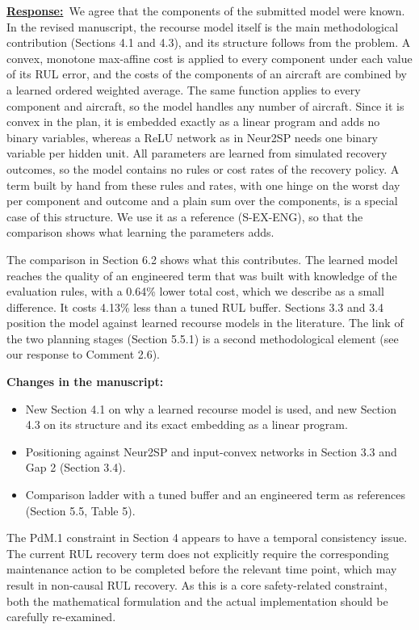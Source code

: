 \documentclass{article}
\newcommand{\response}{\vspace{0.1cm}\noindent\underline{\textbf{Response:}}\ }
\newcommand{\changes}{\vspace{0.1cm}\noindent\textbf{Changes in the manuscript:}}
\begin{document}
\response We agree that the components of the submitted model were known. In the revised manuscript, the recourse model itself is the main methodological contribution (Sections 4.1 and 4.3), and its structure follows from the problem. A convex, monotone max-affine cost is applied to every component under each value of its RUL error, and the costs of the components of an aircraft are combined by a learned ordered weighted average. The same function applies to every component and aircraft, so the model handles any number of aircraft. Since it is convex in the plan, it is embedded exactly as a linear program and adds no binary variables, whereas a ReLU network as in Neur2SP needs one binary variable per hidden unit. All parameters are learned from simulated recovery outcomes, so the model contains no rules or cost rates of the recovery policy. A term built by hand from these rules and rates, with one hinge on the worst day per component and outcome and a plain sum over the components, is a special case of this structure. We use it as a reference (S-EX-ENG), so that the comparison shows what learning the parameters adds.

The comparison in Section 6.2 shows what this contributes. The learned model reaches the quality of an engineered term that was built with knowledge of the evaluation rules, with a 0.64\% lower total cost, which we describe as a small difference. It costs 4.13\% less than a tuned RUL buffer. Sections 3.3 and 3.4 position the model against learned recourse models in the literature. The link of the two planning stages (Section 5.5.1) is a second methodological element (see our response to Comment 2.6).

\changes
\begin{itemize}[nosep]
\item New Section 4.1 on why a learned recourse model is used, and new Section 4.3 on its structure and its exact embedding as a linear program.
\item Positioning against Neur2SP and input-convex networks in Section 3.3 and Gap 2 (Section 3.4).
\item Comparison ladder with a tuned buffer and an engineered term as references (Section 5.5, Table 5).
\end{itemize}

\begin{cmt}{}{}
The PdM.1 constraint in Section 4 appears to have a temporal consistency issue. The current RUL recovery term does not explicitly require the corresponding maintenance action to be completed before the relevant time point, which may result in non-causal RUL recovery. As this is a core safety-related constraint, both the mathematical formulation and the actual implementation should be carefully re-examined.
\end{cmt}
\end{document}
